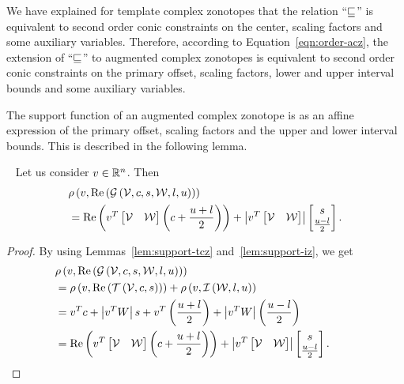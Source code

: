 %
\begin{remark}
We have explained for template complex zonotopes that the relation
``$\sqsubseteq$'' is equivalent to second order conic constraints on the
center, scaling factors and some auxiliary variables.  Therefore,
according to Equation~\ref{eqn:order-acz}, the extension of ``$\sqsubseteq$''
to augmented complex zonotopes is equivalent to second order conic
constraints on the primary offset, scaling factors, lower and upper
interval bounds and some auxiliary variables.
\end{remark}
%
The support function of an augmented complex zonotope is as an affine
expression of the primary offset, scaling factors and the upper and
lower interval bounds.  This is described in the following lemma.
%
\begin{lemma}~\label{lem:support-acz}
Let us consider
$v\in\mathbb{R}^n$.  Then
%
\begin{align*}
  & \rho\left(v,\operatorname{Re}\left(\mathcal{G}\left(\mathcal{V},c,s,\mathcal{W},l,u\right)\right)\right)\\
  & = \operatorname{Re}\left(v^T\left[\begin{matrix}\mathcal{V} &
    \mathcal{W}\end{matrix}\right]\left(c+\frac{u+l}{2}\right)\right)+\left|v^T\left[\begin{matrix}\mathcal{V} & \mathcal{W}\end{matrix}\right]\right|\left[\begin{matrix}s\\\frac{u-l}{2}\end{matrix}\right].
\end{align*}
%
\end{lemma}
%
\begin{proof}
  By using Lemmas~\ref{lem:support-tcz} and~\ref{lem:support-iz}, we get
  \begin{align*}
    &
    \rho\left(v,\operatorname{Re}\left(\mathcal{G}\left(\mathcal{V},c,s,\mathcal{W},l,u\right)\right)\right)\\
    & = \rho\left(v,\operatorname{Re}\left(\mathit{\operatorname{\mathcal{T}}}\left(\mathcal{V},c,s\right)\right)\right)+\rho\left(v,\mathit{\operatorname{\mathcal{I}}}\left(\mathcal{W},l,u\right)\right)\\
    & = v^Tc+\left|v^TW\right|s+v^T\left(\frac{u+l}{2}\right)+\left|v^TW\right|\left(\frac{u-l}{2}\right)\\
    & =\operatorname{Re}\left(v^T\left[\begin{matrix}\mathcal{V} &
    \mathcal{W}\end{matrix}\right]\left(c+\frac{u+l}{2}\right)\right)+\left|v^T\left[\begin{matrix}\mathcal{V} & \mathcal{W}\end{matrix}\right]\right|\left[\begin{matrix}s\\\frac{u-l}{2}\end{matrix}\right].~\hspace{2em}\qedhere
  \end{align*}
\end{proof}
%


